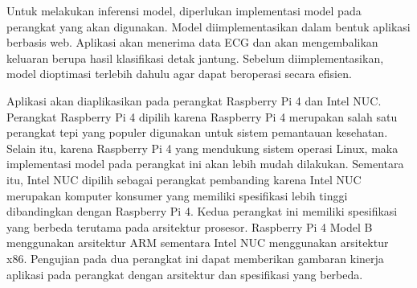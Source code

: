 Untuk melakukan inferensi model, diperlukan implementasi model pada perangkat yang akan digunakan.
Model diimplementasikan dalam bentuk aplikasi berbasis web.
Aplikasi akan menerima data ECG dan akan mengembalikan keluaran berupa hasil klasifikasi detak jantung.
Sebelum diimplementasikan, model dioptimasi terlebih dahulu agar dapat beroperasi secara efisien.

Aplikasi akan diaplikasikan pada perangkat Raspberry Pi 4 dan Intel NUC.
Perangkat Raspberry Pi 4 dipilih karena Raspberry Pi 4 merupakan salah satu perangkat tepi yang populer digunakan untuk sistem pemantauan kesehatan.
Selain itu, karena Raspberry Pi 4 yang mendukung sistem operasi Linux, maka implementasi model pada perangkat ini akan lebih mudah dilakukan.
Sementara itu, Intel NUC dipilih sebagai perangkat pembanding karena Intel NUC merupakan komputer konsumer yang memiliki spesifikasi lebih tinggi dibandingkan dengan Raspberry Pi 4.
Kedua perangkat ini memiliki spesifikasi yang berbeda terutama pada arsitektur prosesor.
Raspberry Pi 4 Model B menggunakan arsitektur ARM sementara Intel NUC menggunakan arsitektur x86.
Pengujian pada dua perangkat ini dapat memberikan gambaran kinerja aplikasi pada perangkat dengan arsitektur dan spesifikasi yang berbeda.




